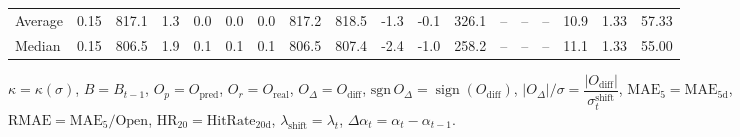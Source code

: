 \begin{threeparttable}
{\begin{tabular}{lrrrrrrrrrrrrrrrrr}
Average &     0.15 & 817.1 &               1.3 &               0.0 &                0.0 &                0.0 & 817.2 & 818.5 &       -1.3 &                     -0.1 &               326.1 &         -- &        -- &             -- &             10.9 &            1.33 &                  57.33 \\
 Median &     0.15 & 806.5 &               1.9 &               0.1 &                0.1 &                0.1 & 806.5 & 807.4 &       -2.4 &                     -1.0 &               258.2 &         -- &        -- &             -- &             11.1 &            1.33 &                  55.00 \\
\bottomrule
\end{tabular}
}
\begin{tablenotes}\footnotesize
\item $\kappa=\kappa(\sigma)$, $B=B_{t-1}$, $O_p=O_{\text{pred}}$, $O_r=O_{\text{real}}$, $O_\Delta=O_{\text{diff}}$, $\mathrm{sgn}\,O_\Delta=\operatorname{sign}(O_{\text{diff}})$, $|O_\Delta|/\sigma=\dfrac{|O_{\text{diff}}|}{\sigma_t^{\text{shift}}}$, $\mathrm{MAE}_5=\mathrm{MAE}_{5\text{d}}$, $\mathrm{RMAE}= \mathrm{MAE}_5 / \text{Open}$, $\mathrm{HR}_{20}=\mathrm{HitRate}_{20\text{d}}$, 
$\lambda_{\text{shift}}=\lambda_t$, 
$\Delta\alpha_t=\alpha_t-\alpha_{t-1}$.
\end{tablenotes}
\end{threeparttable}
\endgroup

